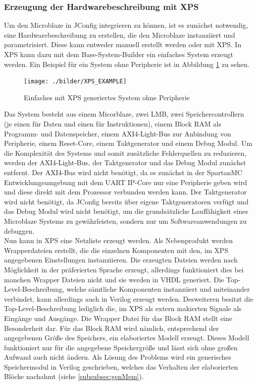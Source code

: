 \subsubsection{Erzeugung der Hardwarebeschreibung mit XPS}
Um den Microblaze in JConfig integrieren zu können, ist es zunächst notwendig, eine Hardwarebeschreibung zu erstellen, die den Microblaze instanziiert und parametrisiert.
Diese kann entweder manuell erstellt werden oder mit XPS. In XPS kann dazu mit dem Base-System-Builder ein einfaches System erzeugt werden. Ein Beispiel für ein System ohne Peripherie ist in Abbildung \ref{fig:XPS_EXAMPLE} zu sehen.
\begin{figure}[ht!]
\centering
\texttt{[image: ./bilder/XPS\_EXAMPLE]}
\caption{Einfaches mit XPS generiertes System ohne Peripherie}
\label{fig:XPS_EXAMPLE}
\end{figure}
Das System besteht aus einem Micorblaze, zwei LMB, zwei Speichercontrollern (je einen für Daten und einen für Instruktionen), einem Block RAM als Programm- und Datenspeicher, einem AXI4-Light-Bus zur Anbindung von Peripherie, einem Reset-Core, einem Taktgenerator und einem Debug Modul. Um die Komplexität des Systems und somit zusätzliche Fehlerquellen zu reduzieren, werden der AXI4-Light-Bus, der Taktgenerator und das Debug Modul zunächst entfernt. Der AXI4-Bus wird nicht benötigt, da es zunächst in der SpartanMC Entwicklungsumgebung mit dem UART IP-Core nur eine Peripherie geben wird und diese direkt mit dem Prozessor verbunden werden kann. Der Taktgenerator wird nicht benötigt, da JConfig bereits über eigene Taktgeneratoren verfügt und das Debug Modul wird nicht benötigt, um die grundsätzliche Lauffähigkeit eines Microblaze Systems zu gewährleisten, sondern nur um Softwareanwendungen zu debuggen.\\
Nun kann in XPS eine Netzliste erzeugt werden. Als Nebenprodukt werden Wrapperdateien erstellt, die die einzelnen Komponenten mit den, im XPS angegebenen Einstellungen instanziieren. Die erzeugten Dateien werden nach Möglichkeit in der präferierten Sprache erzeugt, allerdings funktioniert dies bei manchen Wrapper Dateien nicht und sie werden in VHDL generiert. Die Top-Level-Beschreibung, welche sämtliche Komponenten instanziiert und miteinander verbindet, kann allerdings auch in Verilog erzeugt werden. Desweiteren besitzt die Top-Level-Beschreibung lediglich die, im XPS als extern makierten Signale als Eingänge und Ausgänge. Die Wrapper Datei für das Block RAM stellt eine Besonderheit dar. Für das Block RAM wird nämlich, entsprechend der angegebenen Größe des Speichers, ein elaboriertes Modell erzeugt. Dieses Modell funktioniert nur für die angegebene Speichergröße und lässt sich ohne großen Aufwand auch nicht ändern. Als Lösung des Problems wird ein generisches Speichermodul in Verilog geschrieben, welches das Verhalten der elaborierten Blöcke nachahmt (siehe \ref{subsubsec:genMem}).\\
